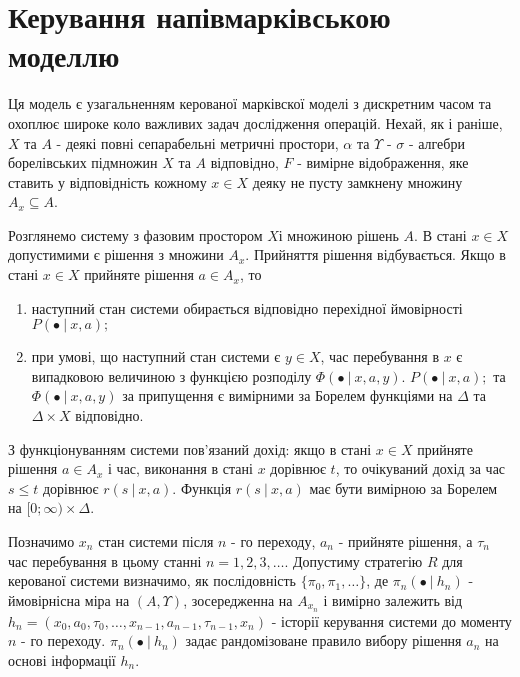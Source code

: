 \documentclass[a4paper, 14pt]{extarticle}
\begin{document}
 \section{Керування напівмарківською моделлю}
\par Ця модель є  узагальненням керованої  марківскої моделі з дискретним часом та охоплює широке коло важливих задач дослідження операцій.
Нехай, як і раніше, $X$ та $A$ - деякі повні сепарабельні метричні простори, $\alpha$ та $\Upsilon$ - $\sigma$ - алгебри борелівських підмножин $X$ та $A$ відповідно, $F$ - вимірне відображення, яке ставить у відповідність кожному $x \in X$ деяку не пусту замкнену множину $A_x \subseteq A$.\par 
Розглянемо систему з фазовим простором $X$і множиною рішень $A$. В стані $x \in X$ допустимими є рішення з множини $A_x$. Прийняття рішення відбувається. Якщо в стані $x \in X$ прийняте рішення $a \in A_x$, то\newline
\begin{enumerate}
\item наступний стан системи обирається відповідно перехідної ймовірності $P(\bullet \ | \ x,a);$
\item  при умові, що наступний стан системи є $y \in  X$, час перебування в $x$ є випадковою величиною з функцією розподілу $\Phi(\bullet \ | \ x,a,y)$. $P(\bullet \ | \ x,a);$ та $\Phi(\bullet \ | \ x,a,y)$ за припущення є вимірними за Борелем функціями на $\Delta$ та $\Delta \times X$ відповідно.
\end{enumerate}
\par З функціонуванням системи пов'язаний дохід: якщо в стані $x \in X$ прийняте рішення $a \in A_x$ і час, виконання в стані $x$ дорівнює $t$, то очікуваний дохід за час $s \leq t$ дорівнює $r(s \ | \ x,a)$. Функція $r(s \ | \ x,a)$ має бути вимірною за Борелем на $ [0; \infty) \times \Delta.$\par 

Позначимо $x_n$ стан системи після $n$ - го переходу, $a_n$ - прийняте рішення, а $\tau_{n}$ час перебування в цьому станні $n = 1,2,3,\ldots$. Допустиму стратегію $R$ для керованої системи визначимо, як послідовність $\{ \pi_0, \pi_1, \ldots  \}$, де $\pi_n(\bullet \ | \ h_n)$ - ймовірнісна міра на $(A,\Upsilon)$, зосередженна на $A_{x_n}$ і вимірно залежить від $h_n = (x_0,a_0,\tau_0,\ldots , x_{n-1}, a_{n-1}, \tau_{n-1}, x_n)$ - історії керування системи до моменту $n$ - го переходу. $\pi_{n} (\bullet \ | \ h_n)$ задає рандомізоване правило вибору рішення $a_n$ на основі інформації $h_n$.\par 
 
\end{document}
